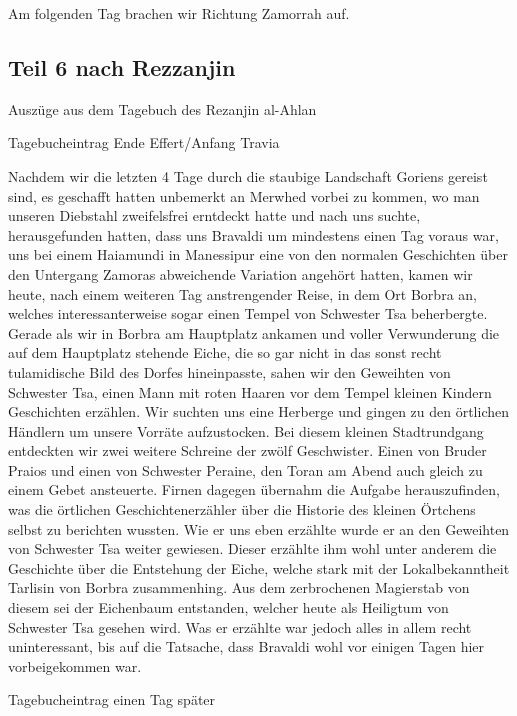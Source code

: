 Am folgenden Tag brachen wir Richtung Zamorrah auf.

\subsection{Teil 6 nach Rezzanjin}

Auszüge aus dem Tagebuch des Rezanjin al-Ahlan

Tagebucheintrag Ende Effert/Anfang Travia

Nachdem wir die letzten 4 Tage durch die staubige Landschaft Goriens gereist sind, es geschafft hatten unbemerkt an Merwhed vorbei zu kommen, wo man unseren Diebstahl zweifelsfrei erntdeckt hatte und nach uns suchte, herausgefunden hatten, dass uns Bravaldi um mindestens einen Tag voraus war, uns bei einem Haiamundi in Manessipur eine von den normalen Geschichten über den Untergang Zamoras abweichende Variation angehört hatten, kamen wir heute, nach einem weiteren Tag anstrengender Reise, in dem Ort Borbra an, welches interessanterweise sogar einen Tempel von Schwester Tsa beherbergte. Gerade als wir in Borbra am Hauptplatz ankamen und voller Verwunderung die auf dem Hauptplatz stehende Eiche, die so gar nicht in das sonst recht tulamidische Bild des Dorfes hineinpasste, sahen wir den Geweihten von Schwester Tsa, einen Mann mit roten Haaren vor dem Tempel kleinen Kindern Geschichten erzählen. Wir suchten uns eine Herberge und gingen zu den örtlichen Händlern um unsere Vorräte aufzustocken. Bei diesem kleinen Stadtrundgang entdeckten wir zwei weitere Schreine der zwölf Geschwister. Einen von Bruder Praios und einen von Schwester Peraine, den Toran am Abend auch gleich zu einem Gebet ansteuerte. Firnen dagegen übernahm die Aufgabe herauszufinden, was die örtlichen Geschichtenerzähler über die Historie des kleinen Örtchens selbst zu berichten wussten. Wie er uns eben erzählte wurde er an den Geweihten von Schwester Tsa weiter gewiesen. Dieser erzählte ihm wohl unter anderem die Geschichte über die Entstehung der Eiche, welche stark mit der Lokalbekanntheit Tarlisin von Borbra zusammenhing. Aus dem zerbrochenen Magierstab von diesem sei der Eichenbaum entstanden, welcher heute als Heiligtum von Schwester Tsa gesehen wird. Was er erzählte war jedoch alles in allem recht uninteressant, bis auf die Tatsache, dass Bravaldi wohl vor einigen Tagen hier vorbeigekommen war.

Tagebucheintrag einen Tag später

